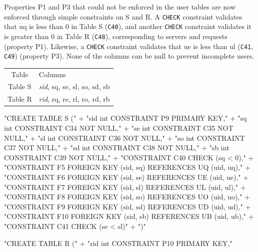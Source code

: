 \documentclass{article}
\def\nwendcode{\endtrivlist \endgroup}      %
\let\nwdocspar=\par
\theoremstyle{definition}                   %
\begin{document}
Properties P1 and P3 that could not be enforced in the user tables are now
enforced through simple constraints on S and R.  A \texttt{CHECK} constraint
validates that \textsf{uq} is less than 0 in Table S ({\tt{}C40}), and another
\texttt{CHECK} constraint validates it is greater than 0 in Table R ({\tt{}C48}),
corresponding to servers and requests (property P1). Likewise, a \texttt{CHECK}
constraint validates that \textsf{ue} is less than \textsf{ul} ({\tt{}C41},
{\tt{}C49}) (property P3). None of the columns can be null to prevent incomplete
users.
\begin{table}[h]
\centering
\small
\begin{tabular}{|c|l|}
\hline
\rowcolor{TableTitle}
\multicolumn{2}{|c|}{User Constraint Tables}\\
\hline
\rowcolor{TableHeader}
Table & Columns \\
\hline
Table S & \textit{sid}, sq, se, sl, so, sd, sb \\
Table R & \textit{rid}, rq, re, rl, ro, rd, rb \\
\hline
\end{tabular}
\end{table}
\nwenddocs{}\endmoddef{}
"CREATE TABLE S ("
  + "sid int  CONSTRAINT P9 PRIMARY KEY,"
  + "sq  int  CONSTRAINT C34 NOT NULL,"
  + "se  int  CONSTRAINT C35 NOT NULL,"
  + "sl  int  CONSTRAINT C36 NOT NULL,"
  + "so  int  CONSTRAINT C37 NOT NULL,"
  + "sd  int  CONSTRAINT C38 NOT NULL,"
  + "sb  int  CONSTRAINT C39 NOT NULL,"
  + "CONSTRAINT C40 CHECK (sq < 0),"
  + "CONSTRAINT F5 FOREIGN KEY (sid, sq) REFERENCES UQ (uid, uq),"
  + "CONSTRAINT F6 FOREIGN KEY (sid, se) REFERENCES UE (uid, ue),"
  + "CONSTRAINT F7 FOREIGN KEY (sid, sl) REFERENCES UL (uid, ul),"
  + "CONSTRAINT F8 FOREIGN KEY (sid, so) REFERENCES UO (uid, uo),"
  + "CONSTRAINT F9 FOREIGN KEY (sid, sd) REFERENCES UD (uid, ud),"
  + "CONSTRAINT F10 FOREIGN KEY (sid, sb) REFERENCES UB (uid, ub),"
  + "CONSTRAINT C41 CHECK (se < sl)"
  + ")"
\nwendcode{}\nwdocspar
\nwenddocs{}\endmoddef{}
"CREATE TABLE R ("
  + "rid int  CONSTRAINT P10 PRIMARY KEY,"
\end{document}
